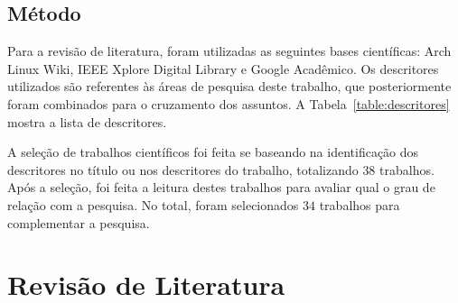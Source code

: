 \documentclass[
article,			%
12pt,				%
openright,			%
oneside,			%
a4paper,			%
chapter=TITLE,		%
section=TITLE,		%
subsection=TITLE,	%
subsubsection=TITLE,%
subsubsubsection=TITLE, %
english,			%
brazil,				%
]{abntex2}
\begin{document}
\subsection{Método}

Para a revisão de literatura, foram utilizadas as seguintes bases
científicas: Arch Linux Wiki, IEEE Xplore Digital Library e Google
Acadêmico. Os descritores utilizados são referentes às áreas de
pesquisa deste trabalho, que posteriormente foram combinados para o
cruzamento dos assuntos. A Tabela~\ref{table:descritores} mostra a
lista de descritores.

\begin{table}[H]
    \centering
    \caption{\label{table:descritores}Descritores utilizados}
\end{table}

A seleção de trabalhos científicos foi feita se baseando na
identificação dos descritores no título ou nos descritores do
trabalho, totalizando $38$ trabalhos.  Após a seleção, foi feita a
leitura destes trabalhos para avaliar qual o grau de relação com a
pesquisa. No total, foram selecionados $34$ trabalhos para
complementar a pesquisa.

\section{Revisão de Literatura}
\end{document}
